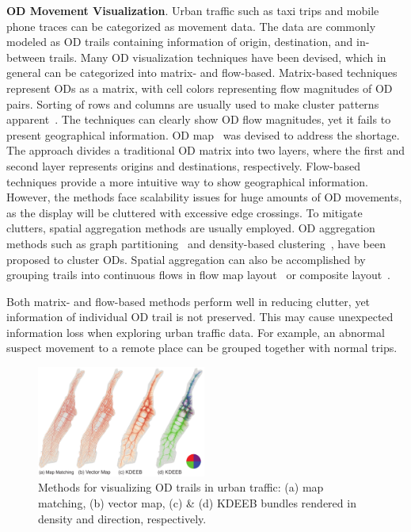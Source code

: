 \noindent
\textbf{OD Movement Visualization}.
Urban traffic such as taxi trips and mobile phone traces can be categorized as movement data.
The data are commonly modeled as OD trails containing information of origin, destination, and in-between trails.
Many OD visualization techniques have been devised, which in general can be categorized into matrix- and flow-based. 
Matrix-based techniques represent ODs as a matrix, with cell colors representing flow magnitudes of OD pairs.
Sorting of rows and columns are usually used to make cluster patterns apparent~\cite{wilkinson2009history}.
The techniques can clearly show OD flow magnitudes, yet it fails to present geographical information. 
OD map~\cite{wood2010visualisation} was devised to address the shortage.
The approach divides a traditional OD matrix into two layers, where the first and second layer represents origins and destinations, respectively.
Flow-based techniques provide a more intuitive way to show geographical information.
However, the methods face scalability issues for huge amounts of OD movements, as the display will be cluttered with excessive edge crossings.
To mitigate clutters, spatial aggregation methods are usually employed.
OD aggregation methods such as graph partitioning~\cite{guo2009flow} and density-based clustering~\cite{von2016mobilitygraphs}, have been proposed to cluster ODs.
Spatial aggregation can also be accomplished by grouping trails into continuous flows in flow map layout~\cite{phan2005flow} or composite layout~\cite{cornel_2016_composite}.

Both matrix- and flow-based methods perform well in reducing clutter, yet information of individual OD trail is not preserved.
This may cause unexpected information loss when exploring urban traffic data.
For example, an abnormal suspect movement to a remote place can be grouped together with normal trips.

\begin{figure}[t] 
	\centering
	\includegraphics[width=0.495\textwidth]{figure/edgebundling/fig1_alternatives/alternatives}
	\vspace{-6mm}
	\caption{Methods for visualizing OD trails in urban traffic: (a) map matching, (b) vector map, (c) \& (d) KDEEB bundles rendered in density and direction, respectively.}
	\label{fig:alternatives}
	\vspace{-5mm}
\end{figure}

